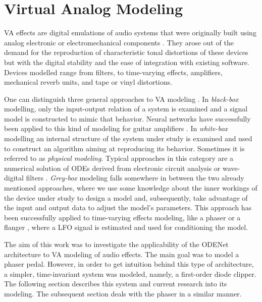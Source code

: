 
\chapter{Virtual Analog Modeling}
\label{chapter:virtual_analog_modeling}
\Ac{VA} effects are digital emulations of audio systems that were originally built using analog electronic or electromechanical components \cite{Zoelzer2011}. They arose out of the demand for the reproduction of characteristic tonal distortions of these devices but with the digital stability and the ease of integration with existing software. Devices modelled range from filters, to time-varying effects, amplifiers, mechanical reverb units, and tape or vinyl distortions.

One can distinguish three general approaches to \ac{VA} modeling \cite{Kiiski2016,Wright2020}. In \emph{black-box} modelling, only the input-output relation of a system is examined and a signal model is constructed to mimic that behavior. Neural networks have successfully been applied to this kind of modeling for guitar amplifiers \cite{Wright2019,Wrightetal2020}. In \emph{white-box} modelling an internal structure of the system under study is examined and used to construct an algorithm aiming at reproducing its behavior. Sometimes it is referred to as \emph{physical modeling}. Typical approaches in this category are a numerical solution of \acp{ODE} derived from electronic circuit analysis \cite{Yeh2007,Eichas2014} or wave-digital filters \cite{PASPWEB2010}. \emph{Grey-box} modeling falls somewhere in between the two already mentioned approaches, where we use some knowledge about the inner workings of the device under study to design a model and, subsequently, take advantage of the input and output data to adjust the model's parameters. This approach has been successfully applied to time-varying effects modeling, like a phaser or a flanger \cite{Kiiski2016,Wright2020}, where a \ac{LFO} signal is estimated and used for conditioning the model.

The aim of this work was to investigate the applicability of the ODENet architecture to \ac{VA} modeling of audio effects. The main goal was to model a phaser pedal. However, in order to get intuition behind this type of architecture, a simpler, time-invariant system was modeled, namely, a first-order diode clipper. The following section describes this system and current research into its modeling. The subsequent section deals with the phaser in a similar manner.

